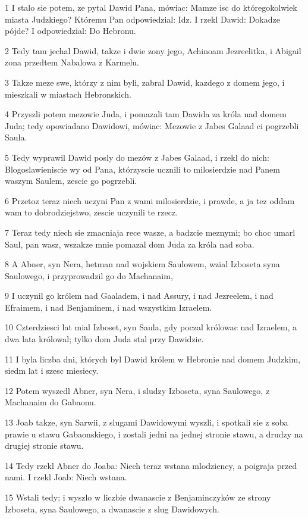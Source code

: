\par 1 I stalo sie potem, ze pytal Dawid Pana, mówiac: Mamze isc do któregokolwiek miasta Judzkiego? Któremu Pan odpowiedzial: Idz. I rzekl Dawid: Dokadze pójde? I odpowiedzial: Do Hebronu.
\par 2 Tedy tam jechal Dawid, takze i dwie zony jego, Achinoam Jezreelitka, i Abigail zona przedtem Nabalowa z Karmelu.
\par 3 Takze meze swe, którzy z nim byli, zabral Dawid, kazdego z domem jego, i mieszkali w miastach Hebronskich.
\par 4 Przyszli potem mezowie Juda, i pomazali tam Dawida za króla nad domem Juda; tedy opowiadano Dawidowi, mówiac: Mezowie z Jabes Galaad ci pogrzebli Saula.
\par 5 Tedy wyprawil Dawid posly do mezów z Jabes Galaad, i rzekl do nich: Blogoslawieniscie wy od Pana, którzyscie ucznili to milosierdzie nad Panem waszym Saulem, zescie go pogrzebli.
\par 6 Przetoz teraz niech uczyni Pan z wami milosierdzie, i prawde, a ja tez oddam wam to dobrodziejstwo, zescie uczynili te rzecz.
\par 7 Teraz tedy niech sie zmacniaja rece wasze, a badzcie meznymi; bo choc umarl Saul, pan wasz, wszakze mnie pomazal dom Juda za króla nad soba.
\par 8 A Abner, syn Nera, hetman nad wojskiem Saulowem, wzial Izboseta syna Saulowego, i przyprowadzil go do Machanaim,
\par 9 I uczynil go królem nad Gaaladem, i nad Assury, i nad Jezreelem, i nad Efraimem, i nad Benjaminem, i nad wszystkim Izraelem.
\par 10 Czterdziesci lat mial Izboset, syn Saula, gdy poczal królowac nad Izraelem, a dwa lata królowal; tylko dom Juda stal przy Dawidzie.
\par 11 I byla liczba dni, których byl Dawid królem w Hebronie nad domem Judzkim, siedm lat i szesc miesiecy.
\par 12 Potem wyszedl Abner, syn Nera, i sludzy Izboseta, syna Saulowego, z Machanaim do Gabaonu.
\par 13 Joab takze, syn Sarwii, z slugami Dawidowymi wyszli, i spotkali sie z soba prawie u stawu Gabaonskiego, i zostali jedni na jednej stronie stawu, a drudzy na drugiej stronie stawu.
\par 14 Tedy rzekl Abner do Joaba: Niech teraz wstana mlodziency, a poigraja przed nami. I rzekl Joab: Niech wstana.
\par 15 Wstali tedy; i wyszlo w liczbie dwanascie z Benjaminczyków ze strony Izboseta, syna Saulowego, a dwanascie z slug Dawidowych.
